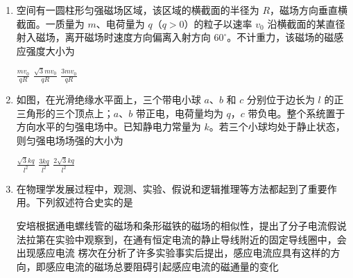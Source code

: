 \documentclass[\gkver]{gaokaozhenti}
\begin{document}
\begin{enumerate}

{figs/16b.png}
{figs/16c.png}
{figs/16d.png}


\item
空间有一圆柱形匀强磁场区域，该区域的横截面的半径为 $R$，磁场方向垂直横截面。一质量为 $m$、电荷量为 $q$（$q>0$）的粒子以速率 $v_{0}$ 沿横截面的某直径射入磁场，离开磁场时速度方向偏离入射方向 $60^\circ$。不计重力，该磁场的磁感应强度大小为

{$\frac{mv_{0}}{qR}$}
{$\frac{\sqrt{3}mv_{0}}{qR}$}
{$\frac{3mv_{0}}{qR}$}


\item
如图，在光滑绝缘水平面上，三个带电小球 $a$、$b$ 和 $c$ 分别位于边长为 $l$ 的正三角形的三个顶点上；$a$、$b$ 带正电，电荷量均为 $q$，$c$ 带负电。整个系统置于方向水平的匀强电场中。已知静电力常量为 $k$。若三个小球均处于静止状态，则匀强电场场强的大小为


{$\frac{\sqrt{3}kq}{l^{2}}$}
{$\frac{3kq}{l^{2}}$}
{$\frac{2\sqrt{3}kq}{l^{2}}$}


\item
在物理学发展过程中，观测、实验、假说和逻辑推理等方法都起到了重要作用。下列叙述符合史实的是

{安培根据通电螺线管的磁场和条形磁铁的磁场的相似性，提出了分子电流假说}
{法拉第在实验中观察到，在通有恒定电流的静止导线附近的固定导线圈中，会出现感应电流}
{楞次在分析了许多实验事实后提出，感应电流应具有这样的方向，即感应电流的磁场总要阻碍引起感应电流的磁通量的变化}


\end{enumerate}
\end{document}
